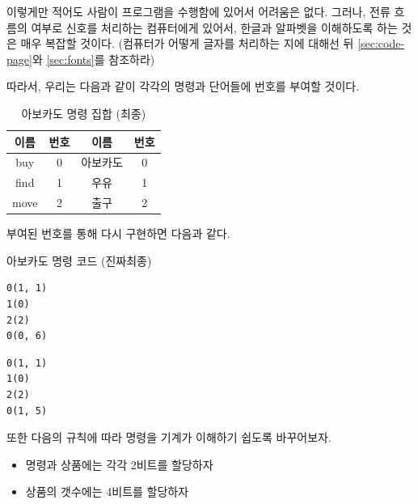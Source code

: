 \documentclass{article}
\begin{document}
이렇게만 적어도 사람이 프로그램을 수행함에 있어서 어려움은 없다.
그러나, 전류 흐름의 여부로 신호를 처리하는 컴퓨터에게 있어서,
한글과 알파벳을 이해하도록 하는 것은 매우 복잡할 것이다.
(컴퓨터가 어떻게 글자를 처리하는 지에 대해선 뒤
\autoref{sec:code-page}와 \autoref{sec:fonts}를 참조하라)

따라서, 우리는 다음과 같이 각각의 명령과 단어들에 번호를 부여할 것이다.

\begin{table}[!h]
    \centering

    \caption{아보카도 명령 집합 (최종)}
    \label{Tab:avocado-isa-int}

    \begin{tabular}{ || c | c | c | c || }
        \hline
        이름 & 번호 & 이름     & 번호 \\
        \hline\hline
        buy  & 0    & 아보카도 & 0    \\
        \hline
        find & 1    & 우유     & 1    \\
        \hline
        move & 2    & 출구     & 2    \\
        \hline
    \end{tabular}
\end{table}

부여된 번호를 통해 다시 구현하면 다음과 같다.

\begin{center}

    \centering

    아보카도 명령 코드 (진짜최종)

    \begin{minipage}{0.45\textwidth}
        \begin{lstlisting}[escapeinside=``]
0(1, 1)
1(0)
2(2)
0(0, 6)
        \end{lstlisting}
    \end{minipage}
    \hfill
    \begin{minipage}{0.45\textwidth}
        \begin{lstlisting}[escapeinside=``]
0(1, 1)
1(0)
2(2)
0(1, 5)
        \end{lstlisting}
    \end{minipage}

\end{center}

또한 다음의 규칙에 따라 명령을 기계가 이해하기 쉽도록 바꾸어보자.

\begin{itemize}
    \item 명령과 상품에는 각각 2비트를 할당하자
    \item 상품의 갯수에는 4비트를 할당하자
\end{itemize}
\end{document}
